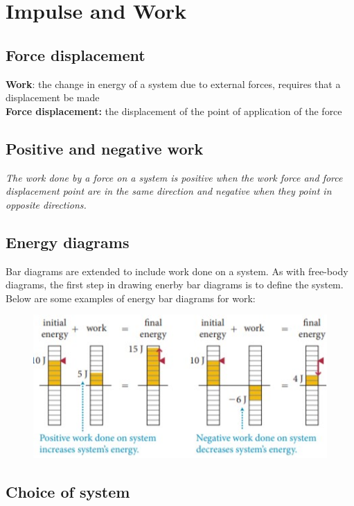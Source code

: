 \section{Impulse and Work}

    \subsection{Force displacement}

        \textbf{Work}: the change in energy of a system due to external forces, requires that a displacement be made \\
        \textbf{Force displacement:} the displacement of the point of application of the force \\


    \subsection{Positive and negative work}

        \textit{The work done by a force on a system is positive when the work force and force displacement point are in the same direction and negative when they point in opposite directions.}


    \subsection{Energy diagrams}

        Bar diagrams are extended to include work done on a system. As with free-body diagrams, the first step in drawing enerby bar diagrams is to define the system. Below are some examples of energy bar diagrams for
        work:

        \begin{figure}[hbt!]
            \centering
            \includegraphics[]{Resources/Work}
        \end{figure}


    \subsection{Choice of system}

